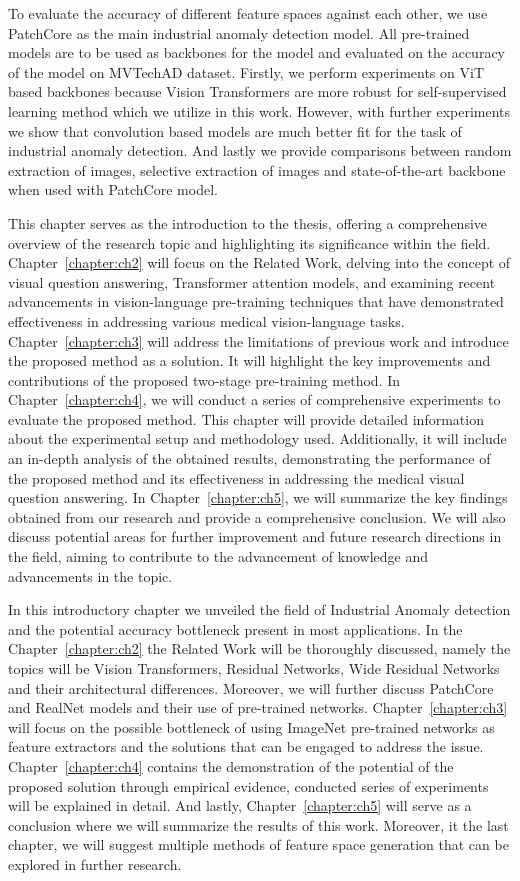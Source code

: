 To evaluate the accuracy of different feature spaces against each other, we use PatchCore as the main industrial anomaly detection model. All pre-trained models are to be used as backbones for the model and evaluated on the accuracy of the model on MVTechAD dataset. Firstly, we perform experiments on ViT based backbones because Vision Transformers are more robust for self-supervised learning method which we utilize in this work. However, with further experiments we show that convolution based models are much better fit for the task of industrial anomaly detection. And lastly we provide comparisons between random extraction of images, selective extraction of images and state-of-the-art backbone when used with PatchCore model.

This chapter serves as the introduction to the thesis, offering a comprehensive overview of the research topic and highlighting its significance within the field. Chapter~\ref{chapter:ch2} will focus on the Related Work, delving into the concept of visual question answering, Transformer attention models, and examining recent advancements in vision-language pre-training techniques that have demonstrated effectiveness in addressing various medical vision-language tasks. Chapter~\ref{chapter:ch3} will address the limitations of previous work and introduce the proposed method as a solution. It will highlight the key improvements and contributions of the proposed two-stage pre-training method. In Chapter~\ref{chapter:ch4}, we will conduct a series of comprehensive experiments to evaluate the proposed method. This chapter will provide detailed information about the experimental setup and methodology used. Additionally, it will include an in-depth analysis of the obtained results, demonstrating the performance of the proposed method and its effectiveness in addressing the medical visual question answering. In Chapter~\ref{chapter:ch5}, we will summarize the key findings obtained from our research and provide a comprehensive conclusion. We will also discuss potential areas for further improvement and future research directions in the field, aiming to contribute to the advancement of knowledge and advancements in the topic.

In this introductory chapter we unveiled the field of Industrial Anomaly detection and the potential accuracy bottleneck present in most applications. In the Chapter~\ref{chapter:ch2} the Related Work will be thoroughly discussed, namely the topics will be Vision Transformers, Residual Networks, Wide Residual Networks and their architectural differences. Moreover, we will further discuss PatchCore and RealNet models and their use of pre-trained networks. Chapter~\ref{chapter:ch3} will focus on the possible bottleneck of using ImageNet pre-trained networks as feature extractors and the solutions that can be engaged to address the issue. Chapter~\ref{chapter:ch4} contains the demonstration of the potential of the proposed solution through empirical evidence, conducted series of experiments will be explained in detail. And lastly, Chapter~\ref{chapter:ch5} will serve as a conclusion where we will summarize the results of this work. Moreover, it the last chapter, we will suggest multiple methods of feature space generation that can be explored in further research.